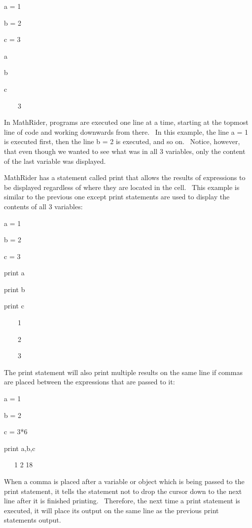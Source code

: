 \documentclass[12pt,twoside]{book}
\begin{document}
\bigskip

a = 1

b = 2

c = 3

a

b

c

{\textbar}

\ \ \ \ 3


\bigskip

In MathRider, programs are executed one line at a time, starting at the
topmost line of code and working downwards from there. \ In this
example, the line a = 1 is executed first, then the line b = 2 is
executed, and so on. \ Notice, however, that even though we wanted to
see what was in all 3 variables, only the content of the last variable
was displayed.


\bigskip

MathRider has a statement called print that allows the results of
expressions to be displayed regardless of where they are located in the
cell. \ This example is similar to the previous one except print
statements are used to display the contents of all 3 variables:


\bigskip

a = 1

b = 2

c = 3

print a

print b

print c

{\textbar}

\ \ \ \ 1

\ \ \ \ 2

\ \ \ \ 3


\bigskip

The print statement will also print multiple results on the same line if
commas are placed between the expressions that are passed to it:


\bigskip

a = 1

b = 2

c = 3*6

print a,b,c

{\textbar}

\ \ \ 1 2 18


\bigskip

When a comma is placed after a variable or object which is being passed
to the print statement, it tells the statement not to drop the cursor
down to the next line after it is finished printing. \ Therefore, the
next time a print statement is executed, it will place its output on
the same line as the previous print statement{\textquotesingle}s
output.
\end{document}
